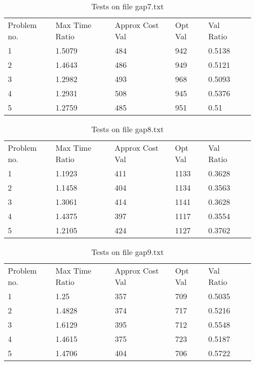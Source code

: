     \begin{table}[]
    \caption{Tests on file gap7.txt}
    \centering
    \begin{tabular}{llllll}
    Problem no. & Max Time Ratio & Approx Cost Val  & Opt Val & Val Ratio \\ 1 & 1.5079 & 484 & 942 & 0.5138\\ \hline
2 & 1.4643 & 486 & 949 & 0.5121\\ \hline
3 & 1.2982 & 493 & 968 & 0.5093\\ \hline
4 & 1.2931 & 508 & 945 & 0.5376\\ \hline
5 & 1.2759 & 485 & 951 & 0.51\\ \hline
\end{tabular}
    \end{table}
    

    \begin{table}[]
    \caption{Tests on file gap8.txt}
    \centering
    \begin{tabular}{llllll}
    Problem no. & Max Time Ratio & Approx Cost Val  & Opt Val & Val Ratio \\ 1 & 1.1923 & 411 & 1133 & 0.3628\\ \hline
2 & 1.1458 & 404 & 1134 & 0.3563\\ \hline
3 & 1.3061 & 414 & 1141 & 0.3628\\ \hline
4 & 1.4375 & 397 & 1117 & 0.3554\\ \hline
5 & 1.2105 & 424 & 1127 & 0.3762\\ \hline
\end{tabular}
    \end{table}
    

    \begin{table}[]
    \caption{Tests on file gap9.txt}
    \centering
    \begin{tabular}{llllll}
    Problem no. & Max Time Ratio & Approx Cost Val  & Opt Val & Val Ratio \\ 1 & 1.25 & 357 & 709 & 0.5035\\ \hline
2 & 1.4828 & 374 & 717 & 0.5216\\ \hline
3 & 1.6129 & 395 & 712 & 0.5548\\ \hline
4 & 1.4615 & 375 & 723 & 0.5187\\ \hline
5 & 1.4706 & 404 & 706 & 0.5722\\ \hline
\end{tabular}
    \end{table}
    

